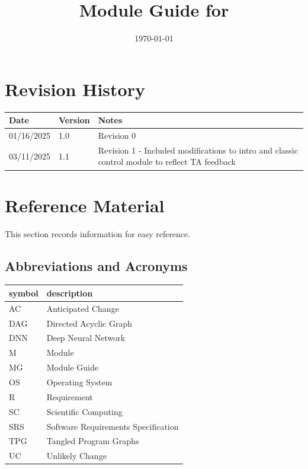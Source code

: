 \documentclass[12pt, titlepage]{article}
\begin{document}
\title{Module Guide for \progname{}} 
\author{\authname}
\date{\today}

\maketitle


\section{Revision History}

\begin{tabularx}{\textwidth}{p{3cm}p{2cm}X}
\toprule {\bf Date} & {\bf Version} & {\bf Notes}\\
\midrule
01/16/2025 & 1.0 & Revision 0\\
03/11/2025 & 1.1 & Revision 1 - Included  modifications to intro and classic control module to reflect TA feedback\\
\bottomrule
\end{tabularx}

\newpage

\section{Reference Material}

This section records information for easy reference.

\subsection{Abbreviations and Acronyms}

\renewcommand{\arraystretch}{1.2}
\begin{tabular}{l l} 
  \toprule		
  \textbf{symbol} & \textbf{description}\\
  \midrule 
  AC & Anticipated Change\\
  DAG & Directed Acyclic Graph \\
  DNN & Deep Neural Network \\
  M & Module \\
  MG & Module Guide \\
  OS & Operating System \\
  R & Requirement\\
  SC & Scientific Computing \\
  SRS & Software Requirements Specification\\
  TPG & Tangled Program Graphs\\
  UC & Unlikely Change \\
  \bottomrule
\end{tabular}\\
\end{document}
